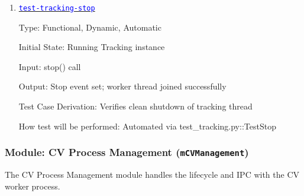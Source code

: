 \documentclass[12pt, titlepage]{article}
\newcommand{\mref}[1]{\texttt{#1}}
\newcommand{\tid}[1]{\hyperlink{tid:#1}{\textcolor{blue}{\texttt{#1}}}}
\begin{document}
\begin{enumerate}
  \item{\tid{test-tracking-stop}\\}

        Type: Functional, Dynamic, Automatic

        Initial State: Running Tracking instance

        Input: stop() call

        Output: Stop event set; worker thread joined successfully

        Test Case Derivation: Verifies clean shutdown of tracking thread

        How test will be performed: Automated via test\_tracking.py::TestStop

\end{enumerate}

\subsubsection{Module: CV Process Management (\mref{mCVManagement})}

The CV Process Management module handles the lifecycle and IPC with the CV
worker process.
\end{document}
